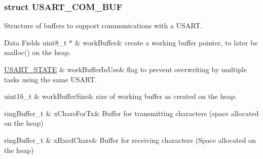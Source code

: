 \subsubsection{struct U\+S\+A\+R\+T\+\_\+\+C\+O\+M\+\_\+\+B\+UF}
Structure of buffers to support communications with a U\+S\+A\+RT. \begin{DoxyFields}{Data Fields}
uint8\+\_\+t $\ast$\hypertarget{group__usart_async_module_a64c93399d08a42c1765945fd61e55a37}{}\label{group__usart_async_module_a64c93399d08a42c1765945fd61e55a37}
&
work\+Buffer&
create a working buffer pointer, to later be malloc() on the heap. \\
\hline

\hyperlink{group__usart_async_module_gab7cdec2c3d93593769da070a66249537}{U\+S\+A\+R\+T\+\_\+\+S\+T\+A\+TE}\hypertarget{group__usart_async_module_a6a82334462f37327dcbb8abb1a947314}{}\label{group__usart_async_module_a6a82334462f37327dcbb8abb1a947314}
&
work\+Buffer\+In\+Use&
flag to prevent overwriting by multiple tasks using the same U\+S\+A\+RT. \\
\hline

uint16\+\_\+t\hypertarget{group__usart_async_module_a9cd4ff1d64ed004d4ea2c11cc0ef3ef7}{}\label{group__usart_async_module_a9cd4ff1d64ed004d4ea2c11cc0ef3ef7}
&
work\+Buffer\+Size&
size of working buffer as created on the heap. \\
\hline

ring\+Buffer\+\_\+t\hypertarget{group__usart_async_module_a1d064875ab32e882e5844584036de92e}{}\label{group__usart_async_module_a1d064875ab32e882e5844584036de92e}
&
x\+Chars\+For\+Tx&
Buffer for transmitting characters (space allocated on the heap) \\
\hline

ring\+Buffer\+\_\+t\hypertarget{group__usart_async_module_ae43df5abead9f1303cf8233c282369cb}{}\label{group__usart_async_module_ae43df5abead9f1303cf8233c282369cb}
&
x\+Rxed\+Chars&
Buffer for receiving characters (Space allocated on the heap) \\
\hline

\end{DoxyFields}
\label{struct_u_s_a_r_t___r_e_g_i_s_t_e_r_s}
\hypertarget{group__usart_async_module_struct_u_s_a_r_t___r_e_g_i_s_t_e_r_s}{}
